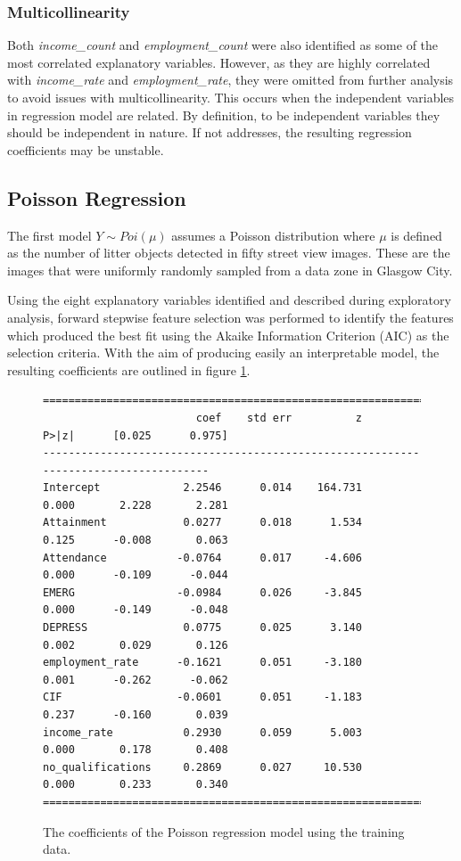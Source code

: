 \documentclass{thesis}
\begin{document}
\subsubsection{Multicollinearity}

Both \textit{income\_count} and \textit{employment\_count} were also identified as some of the most correlated explanatory variables. However, as they are highly correlated with \textit{income\_rate} and \textit{employment\_rate}, they were omitted from further analysis to avoid issues with multicollinearity. This occurs when the independent variables in regression model are related. By definition, to be independent variables they should be independent in nature. If not addresses, the resulting regression coefficients may be unstable.

\subsection{Poisson Regression}

The first model $Y \sim Poi(\mu)$ assumes a Poisson distribution where $\mu$ is defined as the number of litter objects detected in fifty street view images. These are the images that were uniformly randomly sampled from a data zone in Glasgow City.

Using the eight explanatory variables identified and described during exploratory analysis, forward stepwise feature selection was performed to identify the features which produced the best fit using the Akaike Information Criterion (AIC) as the selection criteria. With the aim of producing easily an interpretable model, the resulting coefficients are outlined in figure \ref{fig:pos-coeff}.

\begin{figure}[h!]
    \centering
\footnotesize
\begin{verbatim}
=====================================================================================
                        coef    std err          z      P>|z|      [0.025      0.975]
-------------------------------------------------------------------------------------
Intercept             2.2546      0.014    164.731      0.000       2.228       2.281
Attainment            0.0277      0.018      1.534      0.125      -0.008       0.063
Attendance           -0.0764      0.017     -4.606      0.000      -0.109      -0.044
EMERG                -0.0984      0.026     -3.845      0.000      -0.149      -0.048
DEPRESS               0.0775      0.025      3.140      0.002       0.029       0.126
employment_rate      -0.1621      0.051     -3.180      0.001      -0.262      -0.062
CIF                  -0.0601      0.051     -1.183      0.237      -0.160       0.039
income_rate           0.2930      0.059      5.003      0.000       0.178       0.408
no_qualifications     0.2869      0.027     10.530      0.000       0.233       0.340
=====================================================================================
\end{verbatim}
\normalsize
    \caption{The coefficients of the Poisson regression model using the training data.}
    \label{fig:pos-coeff}
\end{figure}
\end{document}
